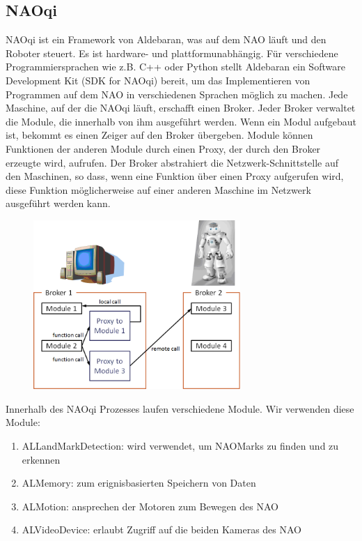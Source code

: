 \subsection{NAOqi}
NAOqi ist ein Framework von Aldebaran, was auf dem NAO läuft und den Roboter steuert. Es ist hardware- und plattformunabhängig. Für verschiedene Programmiersprachen wie z.B. C++ oder Python stellt Aldebaran ein Software Development Kit (SDK for NAOqi) bereit, um das Implementieren von Programmen auf dem NAO in verschiedenen Sprachen möglich zu machen.
Jede Maschine, auf der die NAOqi läuft, erschafft einen Broker. Jeder Broker verwaltet die Module, die innerhalb von ihm ausgeführt werden. Wenn ein Modul aufgebaut ist, bekommt es einen Zeiger auf den Broker übergeben. Module können Funktionen der anderen Module durch einen Proxy, der durch den Broker erzeugte wird, aufrufen.
Der Broker abstrahiert die Netzwerk-Schnittstelle auf den Maschinen, so dass, wenn eine Funktion über einen Proxy aufgerufen wird, diese Funktion möglicherweise auf einer anderen Maschine im Netzwerk ausgeführt werden kann.
\\
\begin{figure}[ht]
    \centering
	\includegraphics[width=0.7\textwidth, angle=0]{img/nao_1.png} 
\end{figure}
Innerhalb des NAOqi Prozesses laufen verschiedene Module. Wir verwenden diese Module:
\begin{enumerate}
\item ALLandMarkDetection: wird verwendet, um NAOMarks zu finden und zu erkennen
\item ALMemory: zum erignisbasierten Speichern von Daten
\item ALMotion: ansprechen der Motoren zum Bewegen des NAO
\item ALVideoDevice: erlaubt Zugriff auf die beiden Kameras des NAO
\end{enumerate}

